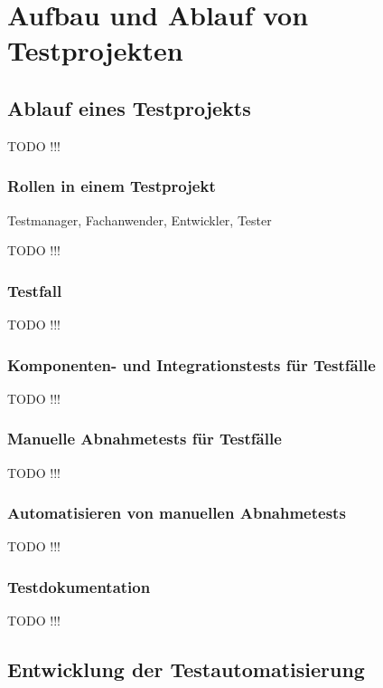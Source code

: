 \chapter{Aufbau und Ablauf von Testprojekten}
\label{cha:Konzept}

\section{Ablauf eines Testprojekts}

TODO !!!

\subsection{Rollen in einem Testprojekt}

Testmanager, Fachanwender, Entwickler, Tester

TODO !!!

\subsection{Testfall}

TODO !!!

\subsection{Komponenten- und Integrationstests für Testfälle}

TODO !!!

\subsection{Manuelle Abnahmetests für Testfälle}

TODO !!!

\subsection{Automatisieren von manuellen Abnahmetests}

TODO !!!

\subsection{Testdokumentation}

TODO !!!

\section{Entwicklung der Testautomatisierung}

